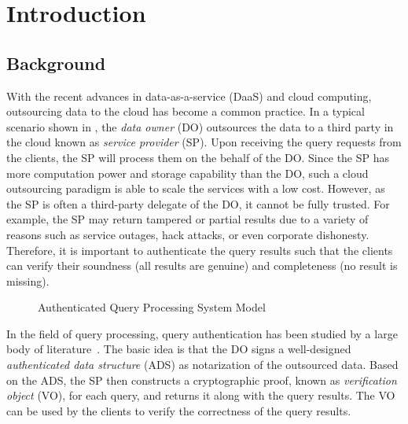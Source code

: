 \chapter{Introduction}\label{chap:intro}

\section{Background}

With the recent advances in data-as-a-service (DaaS) and cloud computing, outsourcing data to the cloud has become a common practice. In a typical scenario shown in , the \emph{data owner} (DO) outsources the data to a third party in the cloud known as \emph{service provider} (SP). Upon receiving the query requests from the clients, the SP will process them on the behalf of the DO\@. Since the SP has more computation power and storage capability than the DO, such a cloud outsourcing paradigm is able to scale the services with a low cost. However, as the SP is often a third-party delegate of the DO, it cannot be fully trusted. For example, the SP may return tampered or partial results due to a variety of reasons such as service outages, hack attacks, or even corporate dishonesty. Therefore, it is important to authenticate the query results such that the clients can verify their soundness (all results are genuine) and completeness (no result is missing).

\begin{figure}[h]
  \centering
  \resizebox{.7\linewidth}{!}{}
  \caption{Authenticated Query Processing System Model}\label{fig:intro:model}
\end{figure}

In the field of query processing, query authentication has been studied by a large body of literature~\cite{10.1109/ICDE.2004.1320027,10.1145/1142473.1142488,10.1007/s00778-008-0113-2,10.1145/1880022.1880026,10.1145/2213836.2213871,10.1145/2463676.2465281,10.14778/2732219.2732224,10.1145/2664243.2664244,10.1145/2723372.2747649,10.1109/tkde.2014.2316818}. The basic idea is that the DO signs a well-designed \emph{authenticated data structure} (ADS) as notarization of the outsourced data. Based on the ADS, the SP then constructs a cryptographic proof, known as \emph{verification object} (VO), for each query, and returns it along with the query results. The VO can be used by the clients to verify the correctness of the query results.

